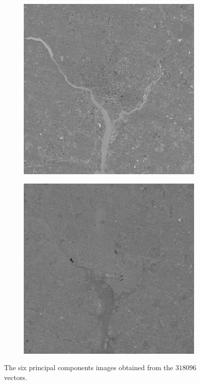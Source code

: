 \begin{figure}[h!]
\begin{subfigure}[b]{0.3\linewidth}
		\caption{}
		\label{fig:10components4}
	\end{subfigure}
	\begin{subfigure}[b]{0.3\linewidth}
		\includegraphics[width=\linewidth]{myfigure/p10/10_components_5.png}
		\caption{}
		\label{fig:10components5}
	\end{subfigure}
	\begin{subfigure}[b]{0.3\linewidth}
		\includegraphics[width=\linewidth]{myfigure/p10/10_components_6.png}
		\caption{}
		\label{fig:10components6}
	\end{subfigure}
	
	\caption{The six principal components images obtained from the $318096$ vectors.}
	\label{fig:10principal}
\end{figure}

